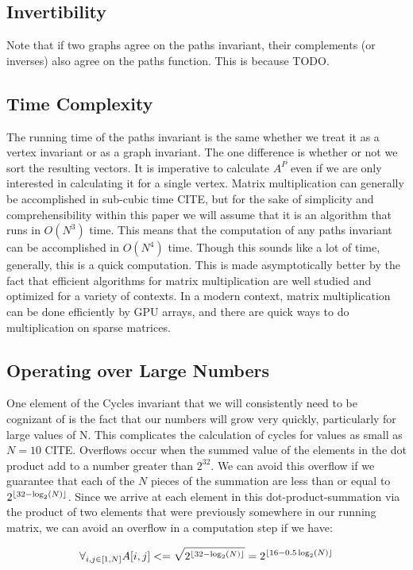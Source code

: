 \documentclass[11pt,a4paper]{report}
\DeclarePairedDelimiter\floor{\lfloor}{\rfloor}
\begin{document}
\subsection{Invertibility}
Note that if two graphs agree on the paths invariant, their complements (or inverses) also agree on the paths function.
This is because TODO.

\subsection{Time Complexity}
The running time of the paths invariant is the same whether we treat it as a vertex invariant or as a graph invariant.
The one difference is whether or not we sort the resulting vectors.
It is imperative to calculate $A^P$ even if we are only interested in calculating it for a single vertex.
Matrix multiplication can generally be accomplished in sub-cubic time CITE, but for the sake of simplicity and comprehensibility within this paper we will assume that it is an algorithm that runs in $O(N^3)$  time.
This means that the computation of any paths invariant can be accomplished in $O(N^4)$ time.
Though this sounds like a lot of time, generally, this is a quick computation.
This is made asymptotically better by the fact that efficient algorithms for matrix multiplication are well studied and optimized for a variety of contexts.
In a modern context, matrix multiplication can be done efficiently by GPU arrays, and there are quick ways to do multiplication on sparse matrices.

\subsection{Operating over Large Numbers}
One element of the Cycles invariant that we will consistently need to be cognizant of is the fact that our numbers will grow very quickly, particularly for large values of N.
This complicates the calculation of cycles for values as small as $N=10$ CITE.
Overflows occur when the summed value of the elements in the dot product add to a number greater than $2^32$.
We can avoid this overflow if we guarantee that each of the $N$ pieces of the summation are less than or equal to $2^{\floor{32 - \log_2(N)}}$.
Since we arrive at each element in this dot-product-summation via the product of two elements that were previously somewhere in our running matrix, we can avoid an overflow in a computation step if we have:

$$ \forall_{i, j \in [1, N]} A[i, j] <= \sqrt{2^{\floor{32 - \log_2(N)}}} = 2^{\floor{16 - 0.5\log_2(N)}}$$
\end{document}
